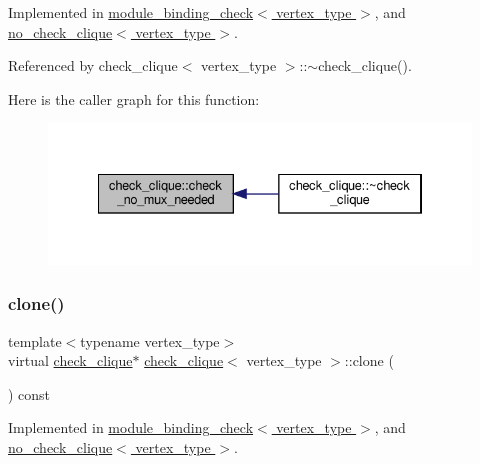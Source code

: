 Implemented in \hyperlink{structmodule__binding__check_a4bea04fdfc26b2ec8c1f98f7b1fff592}{module\+\_\+binding\+\_\+check$<$ vertex\+\_\+type $>$}, and \hyperlink{structno__check__clique_a1eea58910487023f2e2c323ec73490d7}{no\+\_\+check\+\_\+clique$<$ vertex\+\_\+type $>$}.



Referenced by check\+\_\+clique$<$ vertex\+\_\+type $>$\+::$\sim$check\+\_\+clique().

Here is the caller graph for this function\+:
\nopagebreak
\begin{figure}[H]
\begin{center}
\leavevmode
\includegraphics[width=334pt]{d9/d11/structcheck__clique_ad6179189438c0cf415aa52e9c831e854_icgraph}
\end{center}
\end{figure}
\mbox{\label{structcheck__clique_a2a91d2e947216240ac91ea541fd63182}} 
\subsubsection{\texorpdfstring{clone()}{clone()}}
{\footnotesize\ttfamily template$<$typename vertex\+\_\+type$>$ \\
virtual \hyperlink{structcheck__clique}{check\+\_\+clique}$\ast$ \hyperlink{structcheck__clique}{check\+\_\+clique}$<$ vertex\+\_\+type $>$\+::clone (\begin{DoxyParamCaption}{ }\end{DoxyParamCaption}) const\hspace{0.3cm}{\ttfamily [pure virtual]}}



Implemented in \hyperlink{structmodule__binding__check_a90b355e641f9f90ee4e1c2d1bf7d8929}{module\+\_\+binding\+\_\+check$<$ vertex\+\_\+type $>$}, and \hyperlink{structno__check__clique_aa177c43e3c4736962a041c45441e0ec0}{no\+\_\+check\+\_\+clique$<$ vertex\+\_\+type $>$}.



